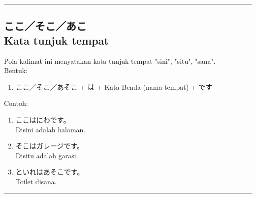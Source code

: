 \vspace{0.2cm}\hrule height 1pt\vspace{0.2cm}

\newpage
\subsection*{
    ここ／そこ／あこ \\
    Kata tunjuk tempat
}
Pola kalimat ini menyatakan kata tunjuk tempat "sini", "situ", "sana".\\
Bentuk:
\begin{enumerate}
    \item ここ／そこ／あそこ + は + Kata Benda (nama tempat) + です
\end{enumerate}
Contoh: 
\begin{enumerate}
    \item ここはにわです。
    \\ Disini adalah halaman.
    \item そこはガレージです。
    \\ Disitu adalah garasi.
    \item といれはあそこです。
    \\ Toilet disana.
\end{enumerate}

\vspace{0.2cm}\hrule height 1pt\vspace{0.2cm}